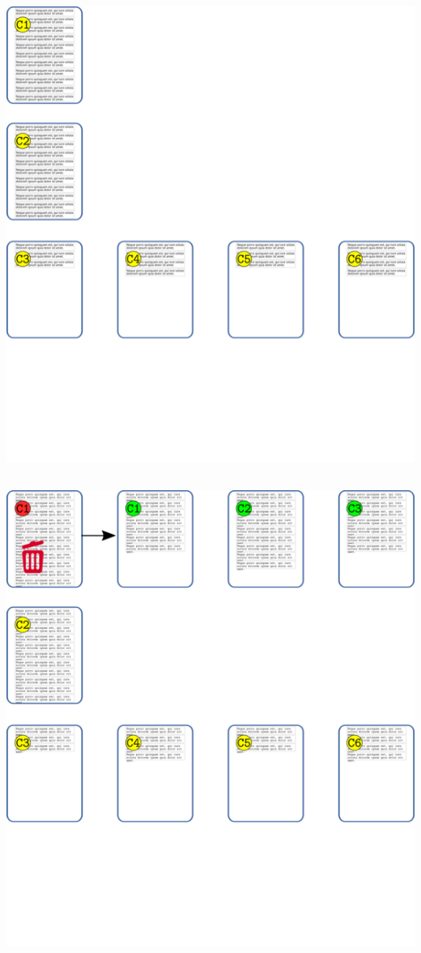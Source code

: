 \includegraphics{imagenes-atlas-8/Categorizacion01.png}

\hypertarget{section-2}{%
\subsection{}\label{section-2}}

\includegraphics{imagenes-atlas-8/Categorizacion02.png}

